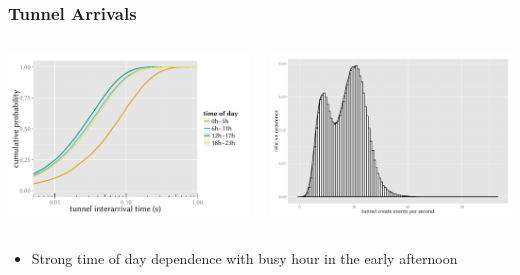 \documentclass{beamer}
\begin{document}
\begin{frame}
	\frametitle{Tunnel Arrivals}
	\begin{columns}[T]
			\includegraphics[width=1.0\columnwidth]{../../chapters/04-mobilenets/images/R-IAT-fromflows-ecdfs-2h.pdf}

			\includegraphics[width=1.0\columnwidth]{../../chapters/04-mobilenets/images/R-create-frequency.pdf}
	\end{columns}

	\begin{itemize}
		\item Strong time of day dependence with busy hour in the early afternoon
	\end{itemize}
\end{frame}
\end{document}
